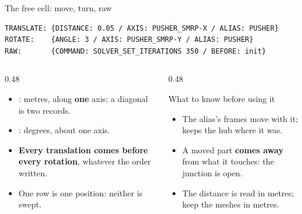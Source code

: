 \begin{frame}[fragile]{The free cell: move, turn, raw}
\begin{lstlisting}[style=ftsbase]
TRANSLATE: {DISTANCE: 0.05 / AXIS: PUSHER_SMRP-X / ALIAS: PUSHER}
ROTATE:    {ANGLE: 3 / AXIS: PUSHER_SMRP-Y / ALIAS: PUSHER}
RAW:       {COMMAND: SOLVER_SET_ITERATIONS 350 / BEFORE: init}
\end{lstlisting}
\begin{columns}[T]
\begin{column}{0.48\textwidth}
\begin{itemize}\small
  \item {}: metres, along \textbf{one} axis; a diagonal
        is two records.
  \item {}: degrees, about one axis.
  \item \textbf{Every translation comes before every rotation}, whatever the
        order written.
  \item One row is one position: neither is swept.
\end{itemize}
\end{column}
\begin{column}{0.48\textwidth}
\begin{alertblock}{What to know before using it}
\begin{itemize}\small
  \item The alias's frames move with it;  keeps
        the hub where it was.
  \item A moved part \textbf{comes away} from what it touches: the junction
        is open.
  \item The distance is read in metres; keep the meshes in metres.
\end{itemize}
\end{alertblock}
\end{column}
\end{columns}
\end{frame}

